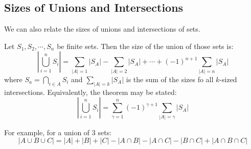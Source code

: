 \documentclass[../Main.tex]{subfiles}
\begin{document}
\subsection{Sizes of Unions and Intersections}
We can also relate the sizes of unions and intersections of sets.
\begin{theorem}
    Let $S_1, S_2, \cdots, S_n$ be finite sets. Then the size of the union of those sets is:
    \begin{equation*}
        \left|\bigcup_{i=1}^n S_i\right| = \sum_{|A|=1} |S_A| - \sum_{|A| = 2} |S_A| + \cdots + (-1)^{n+1} \sum_{|A| = n} |S_A|
    \end{equation*}
    where $S_a = \bigcap_{i \in A} S_i$ and $\sum_{|A| = k} |S_A|$ is the sum of the sizes fo all $k$-sized intersections. Equivalently, the theorem may be stated:
    \begin{equation*}
        \left|\bigcup_{i=1}^n S_i\right| = \sum_{\gamma = 1}^{n} (-1)^{\gamma + 1} \sum_{|A| = \gamma} |S_A|
    \end{equation*}
\end{theorem}
For example, for a union of 3 sets:
\begin{equation*}
    |A \cup B \cup C| = |A| + |B| + |C| - |A \cap B| - |A \cap C| - |B \cap C| + |A \cap B \cap C|
\end{equation*}
\end{document}
